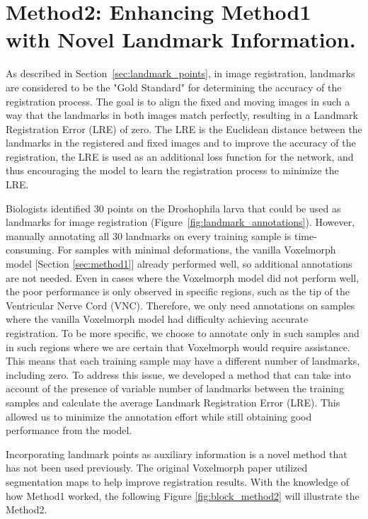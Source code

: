 \documentclass{report}
\begin{document}
	\section{Method2: Enhancing Method1 with Novel Landmark Information.}
	As described in Section~\ref{sec:landmark_points}, in image registration, landmarks are considered to be the "Gold Standard" for determining the accuracy of the registration process. The goal is to align the fixed and moving images in such a way that the landmarks in both images match perfectly, resulting in a Landmark Registration Error (LRE) of zero. The LRE is the Euclidean distance between the landmarks in the registered and fixed images and to improve the accuracy of the registration, the LRE is used as an additional loss function for the network, and thus encouraging the model to learn the registration process to minimize the LRE.
	
	Biologists identified 30 points on the Droshophila larva that could be used as landmarks for image registration (Figure~\ref{fig:landmark_annotations}). However, manually annotating all 30 landmarks on every training sample is time-consuming. For samples with minimal deformations, the vanilla Voxelmorph model [Section \ref{sec:method1}] already performed well, so additional annotations are not needed. Even in cases where the Voxelmorph model did not perform well, the poor performance is only observed in specific regions, such as the tip of the Ventricular Nerve Cord (VNC). Therefore, we only need annotations on samples where the vanilla Voxelmorph model had difficulty achieving accurate registration. To be more specific, we choose to annotate only in such samples and in such regions where we are certain that Voxelmorph would require assistance. This means that each training sample may have a different number of landmarks, including zero. To address this issue, we developed a method that can take into account of the presence of variable number of landmarks between the training samples and calculate the average Landmark Registration Error (LRE). This allowed us to minimize the annotation effort while still obtaining good performance from the model.
	
	Incorporating landmark points as auxiliary information is a novel method that has not been used previously. The original Voxelmorph paper utilized segmentation maps to help improve registration results. With the knowledge of how Method1 worked, the following Figure \ref{fig:block_method2} will illustrate the Method2.
	
\end{document}
